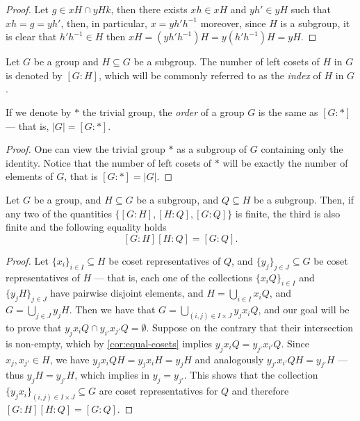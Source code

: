 \begin{proof}
    Let \(g \in xH \cap yHk\), then there exists \(x h \in xH\) and \(y h' \in yH\)
    such that \(x h = g = y h'\), then, in particular, \(x = y h' h^{-1}\) moreover,
    since \(H\) is a subgroup, it is clear that \(h' h^{-1} \in H\) then \(x H = (y
    h' h^{-1})H = y(h' h^{-1})H = y H\).
\end{proof}

\begin{definition}[Index]
    \label{def:grp-index}
    Let \(G\) be a group and \(H \subseteq G\) be a subgroup. The number of left
    cosets of \(H\) in \(G\) is denoted by \([G \colon H]\), which will be commonly
    referred to as the \emph{index} of \(H\) in \(G\).
\end{definition}

\begin{corollary}
    \label{cor:order-as-index}
    If we denote by \(*\) the trivial group, the \emph{order} of a group
    \(G\) is the same as \([G \colon *]\) --- that is, \(|G| = [G \colon *]\).
\end{corollary}

\begin{proof}
    One can view the trivial group \(*\) as a subgroup of \(G\) containing only the
    identity. Notice that the number of left cosets of \(*\) will be exactly the
    number of elements of \(G\), that is \([G \colon *] = |G|\).
\end{proof}

\begin{proposition}
    \label{prop:grp-index-subgroup}
    Let \(G\) be a group, and \(H \subseteq G\) be a subgroup, and \(Q \subseteq H\)
    be a subgroup. Then, if any two of the quantities \(\{[G \colon H], [H \colon
            Q], [G \colon Q]\}\) is finite, the third is also finite and the following
    equality holds
    \[
        [G \colon H] [H \colon Q] = [G \colon Q].
    \]
\end{proposition}

\begin{proof}
    Let \(\{x_{i}\}_{i \in I} \subseteq H\) be coset representatives of \(Q\), and
    \(\{y_{j}\}_{j \in J} \subseteq G\) be coset representatives of \(H\) --- that
    is, each one of the collections \(\{x_i Q\}_{i \in I}\) and \(\{y_{j} H\}_{j \in
    J}\) have pairwise disjoint elements, and \(H = \bigcup_{i \in I} x_i Q\), and
    \(G = \bigcup_{j \in J} y_j H\). Then we have that \(G = \bigcup_{(i, j) \in I
        \times J} y_j x_i Q\), and our goal will be to prove that \(y_j x_i Q \cap
    y_{i'} x_{j'} Q = \emptyset\). Suppose on the contrary that their intersection
    is non-empty, which by \cref{cor:equal-cosets} implies \(y_j x_i Q = y_{j'}
    x_{i'} Q\). Since \(x_j, x_{j'} \in H\), we have \(y_j x_i Q H = y_j x_i H = y_j
    H\) and analogously \(y_{j'} x_{i'} Q H = y_{j'} H\) --- thus \(y_j H = y_{j'}
    H\), which implies in \(y_j = y_{j'}\). This shows that the collection \(\{y_{j}
    x_i\}_{(i, j) \in I \times J} \subseteq G\) are coset representatives for \(Q\)
    and therefore \([G \colon H] [H \colon Q] = [G \colon Q]\).
\end{proof}

